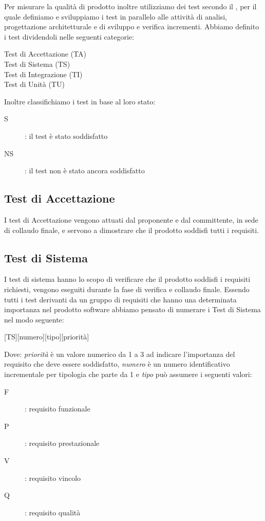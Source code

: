 \documentclass[../piano-di-qualifica.tex]{subfiles}
\begin{document}
Per misurare la qualità di prodotto inoltre utilizziamo dei test secondo il , per il quale definiamo e sviluppiamo i test in parallelo alle attività di analisi, progettazione architetturale e di sviluppo e verifica incrementi.
Abbiamo definito i test dividendoli nelle seguenti categorie:
\begin{description}
  \item [Test di Accettazione (TA)]
  \item [Test di Sistema (TS)]
  \item [Test di Integrazione (TI)]
  \item [Test di Unità (TU)]
\end{description}

Inoltre classifichiamo i test in base al loro stato:
\begin{description}
  \item [S]: il test è stato soddisfatto
  \item [NS]: il test non è stato ancora soddisfatto
\end{description}

\subsection{Test di Accettazione}%
\label{sub:test_di_accettazione}

I test di Accettazione vengono attuati dal proponente e dal committente, in sede di collaudo finale, e servono a dimostrare che il prodotto soddisfi tutti i requisiti.

\subsection{Test di Sistema}%
\label{sub:test_di_sistema}

I test di sistema hanno lo scopo di verificare che il prodotto soddisfi i requisiti richiesti, vengono eseguiti durante la fase di verifica e collaudo finale.
Essendo tutti i test derivanti da un gruppo di requisiti che hanno una determinata importanza nel prodotto software abbiamo pensato di numerare i Test di Sistema nel modo seguente:
\begin{center}
  [TS][numero][tipo][priorità]
\end{center}

Dove: \textit{priorità} è un valore numerico da 1 a 3 ad indicare l'importanza del requisito che deve essere soddisfatto, \textit{numero} è un numero identificativo incrementale per tipologia che parte da 1 e \textit{tipo} può assumere i seguenti valori:
\begin{description}
  \item [F]: requisito funzionale
  \item [P]: requisito prestazionale
  \item [V]: requisito vincolo
  \item [Q]: requisito qualità
\end{description}
\end{document}
